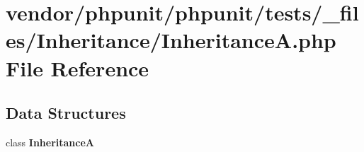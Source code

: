 \section{vendor/phpunit/phpunit/tests/\+\_\+files/\+Inheritance/\+Inheritance\+A.php File Reference}
\label{_inheritance_a_8php}
\subsection*{Data Structures}
\begin{DoxyCompactItemize}
\item 
class {\bf Inheritance\+A}
\end{DoxyCompactItemize}
